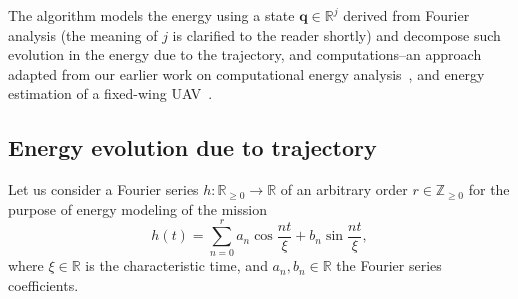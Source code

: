 \documentclass[letterpaper,10pt,conference]{ieeeconf}
\theoremstyle{definition}
\begin{document}
The algorithm models the energy using a state $\mathbf{q}\in\mathbb{R}^j$ derived from Fourier analysis (the meaning of $j$ is clarified to the reader shortly) and decompose such evolution in the energy due to the trajectory, and computations--an approach adapted from our earlier work on computational energy analysis~\cite{seewald2019coarse, seewald2019component}, and energy estimation of a fixed-wing UAV~\cite{seewald2020mechanical}. 

\subsection{Energy evolution due to trajectory}
\label{sec:energy-model}

Let us consider a Fourier series $h:\mathbb{R}_{\geq 0}\rightarrow\mathbb{R}$ of an arbitrary order $r\in\mathbb{Z}_{\geq 0}$ for the purpose of energy modeling of the mission
\begin{equation}\label{eq:fourier}
  h(t)=\sum_{n=0}^{r}{a_n\cos{\frac{nt}{\xi}}+b_n\sin{\frac{nt}{\xi}}},
\end{equation}
where $\xi\in\mathbb{R}$ is the characteristic time, and $a_n, b_n\in\mathbb{R}$ the Fourier series coefficients.
\end{document}
